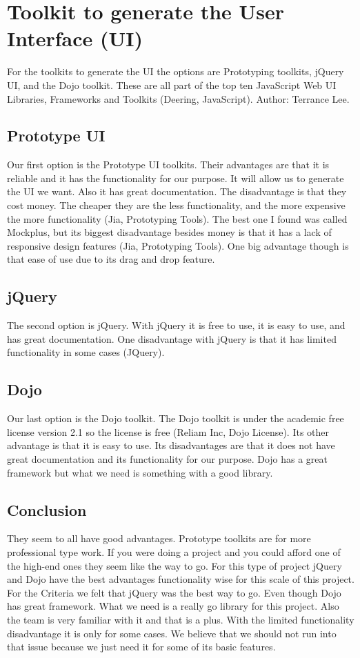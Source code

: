 \documentclass[10pt,draftclsnofoot,onecolumn]{IEEEtran}
\begin{document}
        \section{Toolkit to generate the User Interface (UI)}
 	For the toolkits to generate the UI the options are Prototyping toolkits, jQuery UI, and the Dojo toolkit.
	These are all part of the top ten JavaScript Web UI Libraries, Frameworks and Toolkits (Deering, JavaScript). 
	Author: Terrance Lee.

   	\subsection{Prototype UI}
    	Our first option is the Prototype UI toolkits. 
	Their advantages are that it is reliable and it has the functionality for our purpose. 
	It will allow us to generate the UI we want. Also it has great documentation.
	The disadvantage is that they cost money. 
	The cheaper they are the less functionality, and the more expensive the more functionality (Jia, Prototyping Tools). 
	The best one I found was called Mockplus, but its biggest disadvantage besides money is that it has a lack of responsive design
	features (Jia, Prototyping Tools).
	One big advantage though is that ease of use due to its drag and drop feature.
   	\subsection{jQuery}
    	The second option is jQuery. With jQuery it is free to use, it is easy to use, and has great documentation.
	One disadvantage with jQuery is that it has limited functionality in some cases (JQuery).
   	\subsection{Dojo}
    	Our last option is the Dojo toolkit. 
	The Dojo toolkit is under the academic free license version 2.1 so the license is free (Reliam Inc, Dojo License).
	Its other advantage is that it is easy to use.
	Its disadvantages are that it does not have great documentation and its functionality for our purpose.
	Dojo has a great framework but what we need is something with a good library.
    	\subsection{Conclusion}
     	They seem to all have good advantages. 
	Prototype toolkits are for more professional type work.
	If you were doing a project and you could afford one of the high-end ones they seem like the way to go.
	For this type of project jQuery and Dojo have the best advantages functionality wise for this scale of this project.  
      	For the Criteria we felt that jQuery was the best way to go. Even though Dojo has great framework.
	What we need is a really go library for this project. Also the team is very familiar with it and that is a plus.
	With the limited functionality disadvantage it is only for some cases.
	We believe that we should not run into that issue because we just need it for some of its basic features.
	
	\printindex



\end{document}
